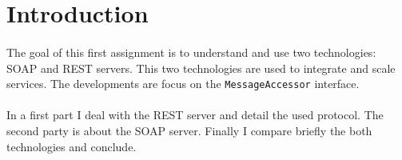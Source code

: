 \section*{Introduction}

\paragraph{}{
    The goal of this first assignment is to understand and use two technologies:
 SOAP and REST servers. This two technologies are used to integrate and scale
 services. The developments are focus on the \texttt{MessageAccessor} interface.
}

\paragraph{}{
    In a first part I deal with the REST server and detail the used protocol.
 The second party is about the SOAP server. Finally I compare briefly the both
 technologies and conclude.
}
